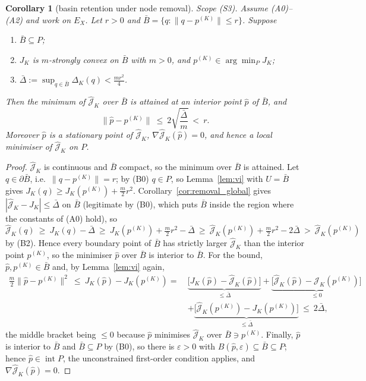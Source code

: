 \documentclass[11pt]{article}
\newtheorem{corollary}{Corollary}
\theoremstyle{remark}\newtheorem{remark}{Remark}
\newcommand{\norm}[1]{\lVert #1\rVert}
\newcommand{\hatJ}{\hat{\mathcal J}}
\begin{document}
\begin{corollary}[basin retention under node removal]\label{cor:basin}
\emph{Scope (S3).} Assume (A0)--(A2) and work on $E_X$. Let $r>0$ and $\bar B=\{q:\norm{q-p^{(K)}}\le r\}$. Suppose
\begin{enumerate}[nosep,label=(B\arabic*),start=0]
\item $\bar B\subseteq P$;
\item $J_K$ is $m$-strongly convex on $\bar B$ with $m>0$, and $p^{(K)}\in\arg\min_{P}J_K$;
\item $\displaystyle\bar\Delta:=\sup_{q\in\bar B}\Delta_K(q)<\frac{m r^2}{4}$.
\end{enumerate}
Then the minimum of $\hatJ_K$ over $\bar B$ is attained at an interior point $\hat p$ of $\bar B$, and
\begin{equation}
\norm{\hat p-p^{(K)}}\ \le\ 2\sqrt{\frac{\bar\Delta}{m}}\ <\ r .
\label{eq:basin}
\end{equation}
Moreover $\hat p$ is a stationary point of $\hatJ_K$, $\nabla\hatJ_K(\hat p)=0$, and hence a local minimiser of $\hatJ_K$ on $P$.
\end{corollary}
\begin{proof}
$\hatJ_K$ is continuous and $\bar B$ compact, so the minimum over $\bar B$ is attained. Let $q\in\partial\bar B$, i.e.\ $\norm{q-p^{(K)}}=r$; by (B0) $q\in P$, so Lemma~\ref{lem:vi} with $U=\bar B$ gives $J_K(q)\ge J_K(p^{(K)})+\tfrac m2r^2$. Corollary~\ref{cor:removal_global} gives $|\hatJ_K-J_K|\le\bar\Delta$ on $\bar B$ (legitimate by (B0), which puts $\bar B$ inside the region where the constants of (A0) hold), so
\[
\hatJ_K(q)\ \ge\ J_K(q)-\bar\Delta\ \ge\ J_K(p^{(K)})+\tfrac m2r^2-\bar\Delta
\ \ge\ \hatJ_K(p^{(K)})+\tfrac m2r^2-2\bar\Delta\ >\ \hatJ_K(p^{(K)})
\]
by (B2). Hence every boundary point of $\bar B$ has strictly larger $\hatJ_K$ than the interior point $p^{(K)}$, so the minimiser $\hat p$ over $\bar B$ is interior to $\bar B$. For the bound, $\hat p,p^{(K)}\in\bar B$ and, by Lemma~\ref{lem:vi} again,
\[
\begin{aligned}
\tfrac m2\norm{\hat p-p^{(K)}}^2\ \le\ J_K(\hat p)-J_K(p^{(K)})
=\ &\underbrace{\big[J_K(\hat p)-\hatJ_K(\hat p)\big]}_{\le\bar\Delta}
+\underbrace{\big[\hatJ_K(\hat p)-\hatJ_K(p^{(K)})\big]}_{\le0}\\
&+\underbrace{\big[\hatJ_K(p^{(K)})-J_K(p^{(K)})\big]}_{\le\bar\Delta}\ \le\ 2\bar\Delta,
\end{aligned}
\]
the middle bracket being $\le0$ because $\hat p$ minimises $\hatJ_K$ over $\bar B\ni p^{(K)}$. Finally, $\hat p$ is interior to $\bar B$ and $\bar B\subseteq P$ by (B0), so there is $\varepsilon>0$ with $B(\hat p,\varepsilon)\subseteq\bar B\subseteq P$; hence $\hat p\in\operatorname{int}P$, the unconstrained first-order condition applies, and $\nabla\hatJ_K(\hat p)=0$.
\end{proof}
\end{document}
